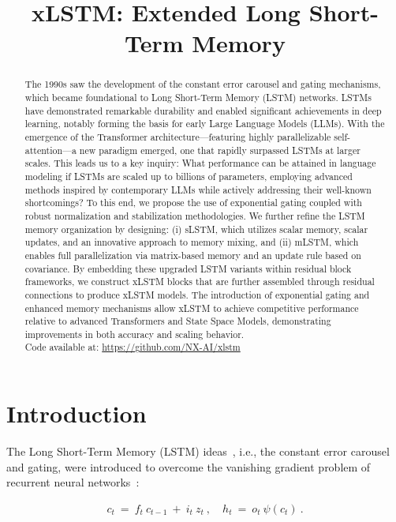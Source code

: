 \title{xLSTM: Extended Long Short-Term Memory}

\begin{abstract}
The 1990s saw the development of the constant error carousel and gating mechanisms, which became foundational to Long Short-Term Memory (LSTM) networks. LSTMs have demonstrated remarkable durability and enabled significant achievements in deep learning, notably forming the basis for early Large Language Models (LLMs). With the emergence of the Transformer architecture—featuring highly parallelizable self-attention—a new paradigm emerged, one that rapidly surpassed LSTMs at larger scales. This leads us to a key inquiry: What performance can be attained in language modeling if LSTMs are scaled up to billions of parameters, employing advanced methods inspired by contemporary LLMs while actively addressing their well-known shortcomings? To this end, we propose the use of exponential gating coupled with robust normalization and stabilization methodologies. We further refine the LSTM memory organization by designing: (i) sLSTM, which utilizes scalar memory, scalar updates, and an innovative approach to memory mixing, and (ii) mLSTM, which enables full parallelization via matrix-based memory and an update rule based on covariance. By embedding these upgraded LSTM variants within residual block frameworks, we construct xLSTM blocks that are further assembled through residual connections to produce xLSTM models. The introduction of exponential gating and enhanced memory mechanisms allow xLSTM to achieve competitive performance relative to advanced Transformers and State Space Models, demonstrating improvements in both accuracy and scaling behavior.\\
Code available at: \url{https://github.com/NX-AI/xlstm}
\end{abstract}

\section{Introduction}
\label{sec:intro}

The Long Short-Term Memory (LSTM) ideas~\citep{Hochreiter:91,Hochreiter:97nips,Hochreiter:97}, i.e., the constant error carousel and gating, were introduced to overcome the vanishing gradient problem of recurrent neural networks~\citep{Hochreiter:91,Hochreiter:00book}:

\begin{align}
\label{eq:lstm_idea}
  c_t \ = \ f_t \ c_{t-1} \ + \ 
          i_t \  z_t \ , \quad  
          h_t \ = \ o_t \ \psi({c_t}) \ . 
\end{align}

